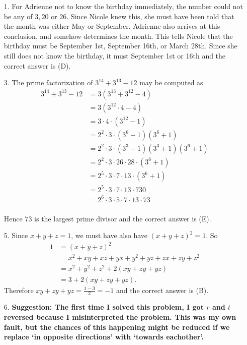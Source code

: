 \documentclass[11pt,fleqn,dvipsnames,usenames]{article}
\newcommand{\p}{\noindent}
\begin{document}
\begin{enumerate}

\item[1.] For Adrienne not to know the birthday immediately, the number could not be any of $3, 20$ or $26$.  Since Nicole knew this, she must have been told that the month was either May or September.  Adrienne also arrives at this conclusion, and somehow determines the month.  This tells Nicole that the birthday must be September 1st, September 16th, or March 28th.  Since she still does not know the birthday, it must September 1st or 16th and the correct answer is (D).

\item[3.] The prime factorization of $3^{14} + 3^{13} - 12$ may be computed as
\begin{align*}
3^{14} + 3^{13} - 12 &= 3(3^{13} + 3^{12} - 4)\\
&=  3(3^{12}\cdot 4 - 4)\\
&=  3\cdot 4\cdot (3^{12}-1)\\
&=  2^2\cdot 3\cdot(3^{6} -1)(3^{6} + 1)\\
&=  2^2\cdot 3\cdot(3^3 - 1)(3^3 + 1)(3^{6} + 1)\\
&=  2^2\cdot 3\cdot 26\cdot 28\cdot (3^{6} + 1)\\
&=  2^5\cdot 3\cdot 7\cdot 13\cdot (3^{6} + 1)\\
&=  2^5\cdot 3\cdot 7\cdot 13\cdot 730\\
&=  2^6\cdot 3\cdot 5\cdot 7\cdot 13\cdot 73\\
\end{align*}

Hence $73$ is the largest prime divisor and the correct answer is (E).

\item[5.] Since $x + y + z = 1$, we must have also have $(x + y + z)^2 = 1$.  So
\begin{align*}
1 &= (x + y + z)^2\\
&= x^2 + xy + xz + yx + y^2 + yz + zx + zy + z^2\\
&= x^2 + y^2 + z^2 + 2(xy + zy + yz)\\
&= 3 + 2(xy + zy + yz).
\end{align*}
Therefore $xy + zy + yz = \frac{1-3}{2} = -1$ and the correct answer is (B).

\item[6.] \p \bf Suggestion: \md The first time I solved this problem, I got $r$ and $t$ reversed because I misinterpreted the problem.  This was my own fault, but the chances of this happening might be reduced if we replace `in opposite directions' with `towards eachother'.


\end{enumerate}
\end{document}
